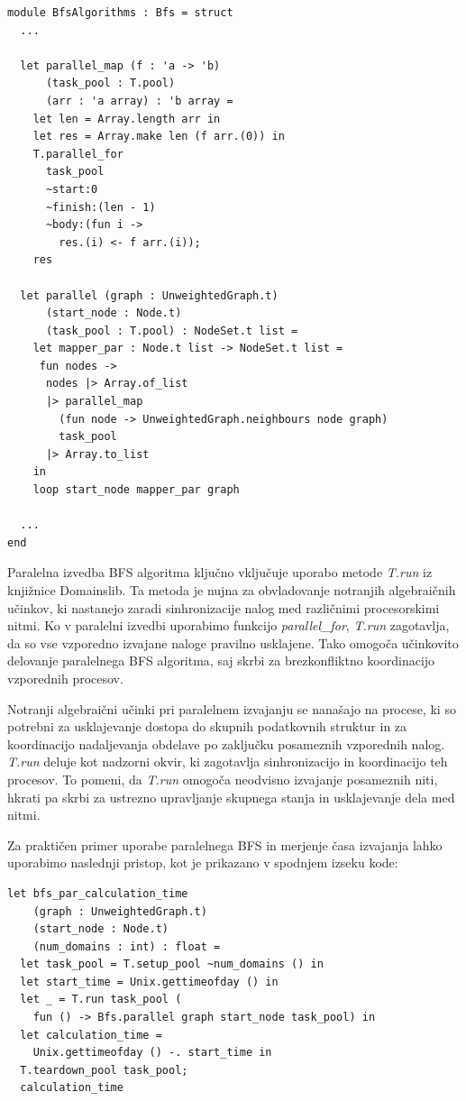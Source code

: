 \documentclass[mat1, tisk]{fmfdelo}
\begin{document}
\begin{lstlisting}[label=lst:bfs_parallel]
module BfsAlgorithms : Bfs = struct
  ...

  let parallel_map (f : 'a -> 'b)
      (task_pool : T.pool)
      (arr : 'a array) : 'b array =
    let len = Array.length arr in
    let res = Array.make len (f arr.(0)) in
    T.parallel_for 
      task_pool 
      ~start:0 
      ~finish:(len - 1) 
      ~body:(fun i ->
        res.(i) <- f arr.(i));
    res

  let parallel (graph : UnweightedGraph.t)
      (start_node : Node.t)
      (task_pool : T.pool) : NodeSet.t list =
    let mapper_par : Node.t list -> NodeSet.t list =
     fun nodes ->
      nodes |> Array.of_list
      |> parallel_map
        (fun node -> UnweightedGraph.neighbours node graph)
        task_pool
      |> Array.to_list
    in
    loop start_node mapper_par graph

  ...
end

\end{lstlisting}

Paralelna izvedba BFS algoritma ključno vključuje uporabo metode \textit{T.run} iz knjižnice Domainslib. Ta metoda je
nujna za obvladovanje notranjih algebraičnih učinkov, ki nastanejo zaradi sinhronizacije nalog med različnimi procesorskimi nitmi.
Ko v paralelni izvedbi uporabimo funkcijo \textit{parallel\_for}, \textit{T.run} zagotavlja, da so vse vzporedno
izvajane naloge pravilno usklajene. Tako omogoča učinkovito delovanje paralelnega BFS algoritma, saj skrbi za
brezkonfliktno koordinacijo vzporednih procesov.

Notranji algebraični učinki pri paralelnem izvajanju se nanašajo na procese, ki so potrebni za usklajevanje dostopa do
skupnih podatkovnih struktur in za koordinacijo nadaljevanja obdelave po zaključku posameznih vzporednih nalog.
\textit{T.run} deluje kot nadzorni okvir, ki zagotavlja sinhronizacijo in koordinacijo teh procesov.
To pomeni, da \textit{T.run} omogoča neodvisno izvajanje posameznih niti, hkrati pa skrbi za ustrezno upravljanje
skupnega stanja in usklajevanje dela med nitmi.

Za praktičen primer uporabe paralelnega BFS in merjenje časa izvajanja lahko uporabimo naslednji pristop, kot je prikazano v spodnjem izseku kode:

\begin{lstlisting}[label=lst:bfs_calculation_time]
let bfs_par_calculation_time 
    (graph : UnweightedGraph.t) 
    (start_node : Node.t)
    (num_domains : int) : float =
  let task_pool = T.setup_pool ~num_domains () in
  let start_time = Unix.gettimeofday () in
  let _ = T.run task_pool (
    fun () -> Bfs.parallel graph start_node task_pool) in
  let calculation_time =
    Unix.gettimeofday () -. start_time in
  T.teardown_pool task_pool;
  calculation_time
\end{lstlisting}
\end{document}
